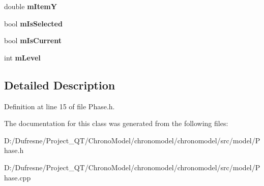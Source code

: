 \begin{DoxyCompactItemize}
\item 
\hypertarget{class_phase_a83a4014d755c4e95c1c1466b3cf1a3d2}{double {\bfseries m\-Item\-Y}}\label{class_phase_a83a4014d755c4e95c1c1466b3cf1a3d2}

\item 
\hypertarget{class_phase_a5a2fbcee9a072fb6f9ce1bb01de6bbde}{bool {\bfseries m\-Is\-Selected}}\label{class_phase_a5a2fbcee9a072fb6f9ce1bb01de6bbde}

\item 
\hypertarget{class_phase_aa8bd1968d675a35e6ab1b835f8989239}{bool {\bfseries m\-Is\-Current}}\label{class_phase_aa8bd1968d675a35e6ab1b835f8989239}

\item 
\hypertarget{class_phase_ab86a05a3ae25b19e105ea90e77629d34}{int {\bfseries m\-Level}}\label{class_phase_ab86a05a3ae25b19e105ea90e77629d34}

\end{DoxyCompactItemize}


\subsection{Detailed Description}


Definition at line 15 of file Phase.\-h.



The documentation for this class was generated from the following files\-:\begin{DoxyCompactItemize}
\item 
D\-:/\-Dufresne/\-Project\-\_\-\-Q\-T/\-Chrono\-Model/chronomodel/chronomodel/src/model/Phase.\-h\item 
D\-:/\-Dufresne/\-Project\-\_\-\-Q\-T/\-Chrono\-Model/chronomodel/chronomodel/src/model/Phase.\-cpp\end{DoxyCompactItemize}
